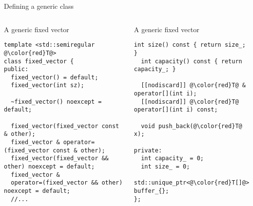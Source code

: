\begin{frame}[t,fragile]{Defining a generic class}

\begin{columns}[T]

\begin{block}{A generic fixed vector}
\begin{lstlisting}[escapechar=@]
template <std::semiregular @\color{red}T@>
class fixed_vector {
public:
  fixed_vector() = default;
  fixed_vector(int sz);

  ~fixed_vector() noexcept = default;

  fixed_vector(fixed_vector const & other);
  fixed_vector & operator=(fixed_vector const & other);
  fixed_vector(fixed_vector && other) noexcept = default;
  fixed_vector & 
  operator=(fixed_vector && other) noexcept = default;
  //...
\end{lstlisting}
\end{block}

\begin{block}{A generic fixed vector}
\begin{lstlisting}[escapechar=@]
  int size() const { return size_; }
  int capacity() const { return capacity_; }

  [[nodiscard]] @\color{red}T@ & operator[](int i);
  [[nodiscard]] @\color{red}T@ operator[](int i) const;

  void push_back(@\color{red}T@ x);

private:
  int capacity_ = 0;
  int size_ = 0;
  std::unique_ptr<@\color{red}T[]@> buffer_{};
};
\end{lstlisting}
\end{block}

\end{columns}
\end{frame}

